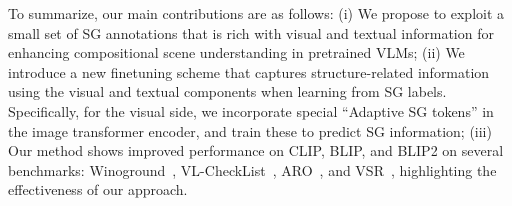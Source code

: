 \documentclass[11pt]{article}
\begin{document}
To summarize, our main contributions are as follows: (i) We propose to exploit a small set of SG annotations that is rich with visual and textual information for enhancing compositional scene understanding in pretrained VLMs; (ii) We introduce a new finetuning scheme that captures structure-related information using the visual and textual components when learning from SG labels. Specifically, for the visual side, we incorporate special ``Adaptive SG tokens'' in the image transformer encoder, and train these to predict SG information; (iii) Our method shows improved performance on CLIP, BLIP, and BLIP2 on several benchmarks: Winoground~\cite{winoground}, VL-CheckList~\cite{vlc}, ARO~\cite{yuksekgonul2023when}, and VSR~\cite{Liu2022VisualSR}, highlighting the effectiveness of our approach.
\end{document}
